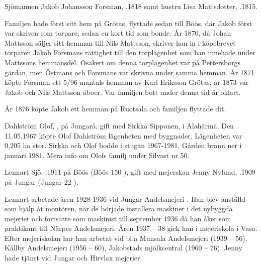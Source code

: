 Sjömannen Jakob Johansson Forsman, .1818 samt hustru Lisa Mattsdotter, .1815.
\begin{jhchildren}
  \item {}
  \item {}
  \item {}
\end{jhchildren}
Familjen hade först sitt hem på Grötas, flyttade sedan till Böös, där Jakob först var skriven som torpare, sedan en kort tid som bonde. År 1870, då Johan Mattsson säljer sitt hemman till Nils Mattsson, skriver han in i köpebrevet torparen Jakob Forsmans rättighet till den torplägenhet som han innehade under Mattssons hemmansdel. Osäkert om denna torplägenhet var på Pettersborgs gärdan, men Östmans och Forsmans var skrivna under samma hemman. År 1871 köpte Forsman ett 5/96 mantals hemman av Karl Eriksson Grötas, år 1873 var Jakob och Nils Mattsson åboer. Var familjen bott under denna tid är oklart.

År 1876 köpte Jakob ett hemman på Ruotsala och familjen flyttade dit.




Dahlström Olof, , på Jungarå, gift med Sirkka Sipponen,  i Alahärmä. Den 11.05.1967 köpte Olof Dahlström lägenheten med byggnader. Lägenheten var 0,205 ha stor. Sirkka och Olof bodde i stugan 1967-1981. Gården brann ner i januari 1981. Mera info om Olofs familj under Silvast nr 50.


Lennart Sjö, .1911 på Böös (Böös 150 ), gift med mejerskan Jenny Nylund, .1909 på Jungar (Jungar 22 ).
\begin{jhchildren}
  \item {}
  \item {}
\end{jhchildren}
Lennart arbetade åren 1928-1936 vid Jungar Andelsmejeri . Han blev anställd som hjälp åt montören, när de började installera maskiner i det nybyggda mejeriet och fortsatte som maskinist till september 1936 då han åker som praktikant till Närpes Andelsmejeri. Åren 1937 – 38 			gick han i mejeriskola i Vasa. Efter mejeriskolan har han arbetat vid bl.a Munsala Andelsmejeri (1939 – 56), Kållby Andelsmejeri (1956 – 60), Jakobstads mjölkcentral (1960 – 76). Jenny hade tjänst vid Jungar och Hirvlax mejerier.

